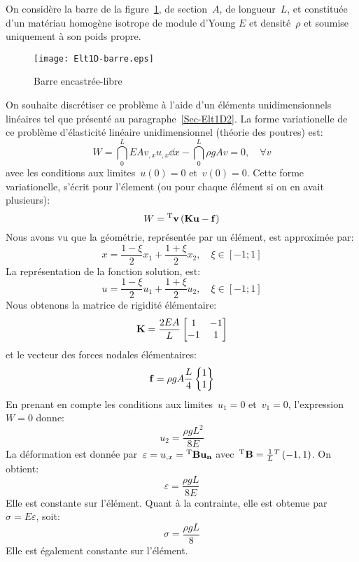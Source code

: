On considère la barre de la figure~\ref{fig-barre}, de section~$A$, de longueur~$L$, et constituée 
d'un matériau homogène isotrope de module d'Young 
$E$ et densité~$\rho$ et soumise uniquement à son poids propre.\\
\begin{figure}[ht]
\centering
\texttt{[image: Elt1D-barre.eps]}
\caption{Barre encastrée-libre}\label{fig-barre}
\end{figure}
On souhaite discrétiser ce problème à l'aide d'un éléments unidimensionnels linéaires
tel que présenté au paragraphe~\ref{Sec-Elt1D2}.
\medskipvm
La forme variationelle de ce problème d'élasticité linéaire unidimensionnel (théorie des poutres) est:
\begin{equation}
W=\dint_0^L EA v_{,x}u_{,x} \dd x - \dint_0^L \rho g A v = 0, \quad \forall v
\end{equation}
avec les conditions aux limites~$u(0)=0$ et~$v(0)=0$.
Cette forme variationelle, s'écrit pour l'élement (ou pour chaque élément si on en avait plusieurs):
\begin{equation}
W = \LL{v} \left( \MM{K}\VV{u} - \VV{f} \right)
\end{equation}
\medskipvm
Nous avons vu que la géométrie, représentée par un élément, est approximée par:
\begin{equation} x=\frac{1-\xi}2 x_1 + \frac{1+\xi}2 x_2, \quad \xi\in[-1;1] \end{equation}
La représentation de la fonction solution, est:
\begin{equation} u = \frac{1-\xi}2 u_1 + \frac{1+\xi}2 u_2, \quad \xi\in[-1;1] \end{equation}
\medskipvm
Nous obtenons la matrice de rigidité élémentaire:
\begin{equation} 
\MM{K} = \frac{2EA}L \MM*{1 & -1\\ -1& 1}
\end{equation}
et le vecteur des forces nodales élémentaires:
\begin{equation} 
\VV{f} = \rho g A \frac{L}4 \VV*{1 \\1}
\end{equation}
\medskipvm
En prenant en compte les conditions aux limites~$u_1=0$ et~$v_1=0$, l'expression~$W=0$ donne:
\begin{equation} u_2 = \frac{\rho g L^2}{8 E} \end{equation}
\medskipvm
La déformation est donnée par~$\varepsilon=u_{,x}=\LL{B}\VV{u_n}$ avec~${}^\mathrm{T}\mathbf{B}=\frac1L {}^T\left( -1, 1\right)$.
On obtient:
\begin{equation}
\varepsilon=\frac{\rho g L}{8 E}
\end{equation} 
Elle est constante sur l'élément. Quant à la contrainte, elle est obtenue par~$\sigma=E\varepsilon$, soit:
\begin{equation}\sigma=\frac{\rho g L}8\end{equation} Elle est également constante sur l'élément.
\medskipvm
